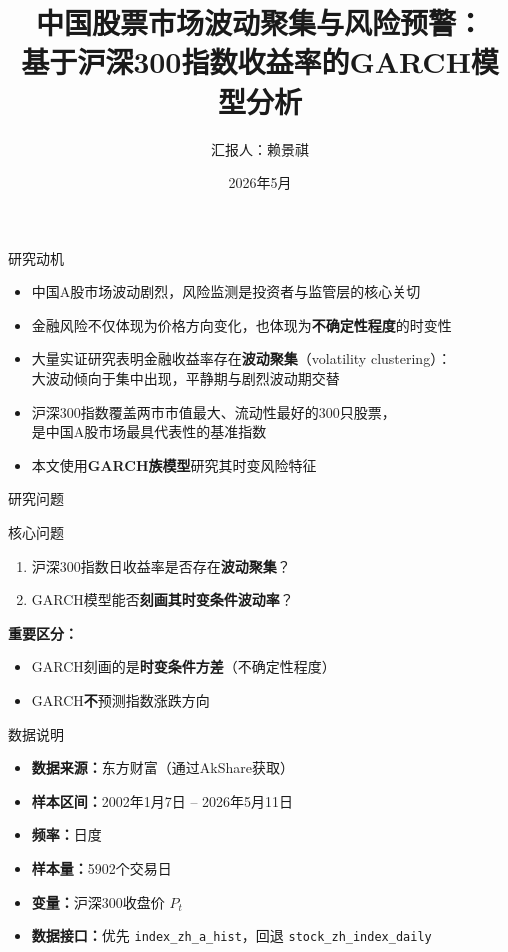 \documentclass[10pt,aspectratio=169]{beamer}
\title{中国股票市场波动聚集与风险预警：\\基于沪深300指数收益率的GARCH模型分析}
\author{汇报人：赖景祺}
\date{2026年5月}
\begin{document}
\begin{frame}
  \titlepage
\end{frame}

\begin{frame}{研究动机}
  \begin{itemize}
    \item 中国A股市场波动剧烈，风险监测是投资者与监管层的核心关切
    \item 金融风险不仅体现为价格方向变化，也体现为\textbf{不确定性程度}的时变性
    \item 大量实证研究表明金融收益率存在\textbf{波动聚集}（volatility clustering）：\\
    大波动倾向于集中出现，平静期与剧烈波动期交替
    \item 沪深300指数覆盖两市市值最大、流动性最好的300只股票，\\
    是中国A股市场最具代表性的基准指数
    \item 本文使用\textbf{GARCH族模型}研究其时变风险特征
  \end{itemize}
\end{frame}

\begin{frame}{研究问题}
  \begin{block}{核心问题}
    \begin{enumerate}
      \item 沪深300指数日收益率是否存在\textbf{波动聚集}？
      \item GARCH模型能否\textbf{刻画其时变条件波动率}？
    \end{enumerate}
  \end{block}
  \vspace{1em}
  \textbf{重要区分：}
  \begin{itemize}
    \item GARCH刻画的是\textbf{时变条件方差}（不确定性程度）
    \item GARCH\textbf{不}预测指数涨跌方向
  \end{itemize}
\end{frame}

\begin{frame}{数据说明}
  \begin{itemize}
    \item \textbf{数据来源：}东方财富（通过AkShare获取）
    \item \textbf{样本区间：}2002年1月7日 -- 2026年5月11日
    \item \textbf{频率：}日度
    \item \textbf{样本量：}5902个交易日
    \item \textbf{变量：}沪深300收盘价 $P_t$
    \item \textbf{数据接口：}优先 \texttt{index\_zh\_a\_hist}，回退 \texttt{stock\_zh\_index\_daily}
  \end{itemize}
\end{frame}
\end{document}
